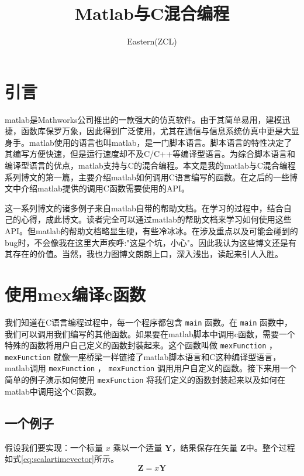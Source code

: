 \documentclass[10pt,a4paper,UTF8]{article}
\author{Eastern(ZCL)}
\date{}
\title{Matlab与C混合编程}
\begin{document}
\maketitle\xiaosihao
\tableofcontents\newpage\newpage


\section{引言}
\label{sec:orgheadline1}


matlab是Mathworks公司推出的一款强大的仿真软件。由于其简单易用，建模迅捷，函数库保罗万象，因此得到广泛使用，尤其在通信与信息系统仿真中更是大显身手。matlab使用的语言也叫matlab，是一门脚本语言。脚本语言的特性决定了其编写方便快速，但是运行速度却不及C/C++等编译型语言。为综合脚本语言和编译型语言的优点，matlab支持与C的混合编程。本文是我的matlab与C混合编程系列博文的第一篇，主要介绍matlab如何调用C语言编写的函数。在之后的一些博文中介绍matlab提供的调用C函数需要使用的API。

这一系列博文的诸多例子来自matlab自带的帮助文档。在学习的过程中，结合自己的心得，成此博文。读者完全可以通过matlab的帮助文档来学习如何使用这些API。但matlab的帮助文档略显生硬，有些冷冰冰。在涉及重点以及可能会碰到的bug时，不会像我在这里大声疾呼:"这是个坑，小心"。因此我认为这些博文还是有其存在的价值。当然，我也力图博文朗朗上口，深入浅出，读起来引人入胜。

\section{使用mex编译c函数}
\label{sec:orgheadline7}


我们知道在C语言编程过程中，每一个程序都包含 \texttt{main} 函数。在 \texttt{main}  函数中，我们可以调用我们编写的其他函数。如果要在matlab脚本中调用c函数，需要一个特殊的函数将用户自己定义的函数封装起来。这个函数叫做 \texttt{mexFunction} ， \texttt{mexFunction} 就像一座桥梁一样链接了matlab脚本语言和C这种编译型语言，matlab调用 \texttt{mexFunction} ， \texttt{mexFunction} 调用用户自定义的函数。接下来用一个简单的例子演示如何使用 \texttt{mexFunction} 将我们定义的函数封装起来以及如何在matlab中调用这个C函数。
\subsection{一个例子}
\label{sec:orgheadline2}


假设我们要实现：一个标量 \(x\)  乘以一个适量 \(\mathbf{Y}\)，结果保存在矢量 \(\mathbf{Z}\)中。整个过程如式\ref{eq:scalartimevector}所示。
\begin{equation}
\label{eq:scalartimevector}
\mathbf{Z} = x\mathbf{Y}
\end{equation}
\end{document}
